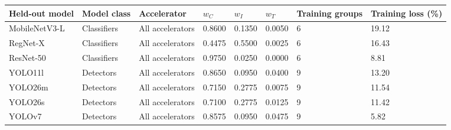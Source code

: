\begin{tabular}{@{}llllllll@{}}
\toprule
Held-out model & Model class & Accelerator & $w_C$ & $w_I$ & $w_T$ & Training groups & Training loss (\%) \\
\midrule
MobileNetV3-L & Classifiers & All accelerators & 0.8600 & 0.1350 & 0.0050 & 6 & 19.12 \\
RegNet-X & Classifiers & All accelerators & 0.4475 & 0.5500 & 0.0025 & 6 & 16.43 \\
ResNet-50 & Classifiers & All accelerators & 0.9750 & 0.0250 & 0.0000 & 6 & 8.81 \\
YOLO11l & Detectors & All accelerators & 0.8650 & 0.0950 & 0.0400 & 9 & 13.20 \\
YOLO26m & Detectors & All accelerators & 0.7150 & 0.2775 & 0.0075 & 9 & 11.54 \\
YOLO26s & Detectors & All accelerators & 0.7100 & 0.2775 & 0.0125 & 9 & 11.42 \\
YOLOv7 & Detectors & All accelerators & 0.8575 & 0.0950 & 0.0475 & 9 & 5.82 \\
\bottomrule
\end{tabular}
